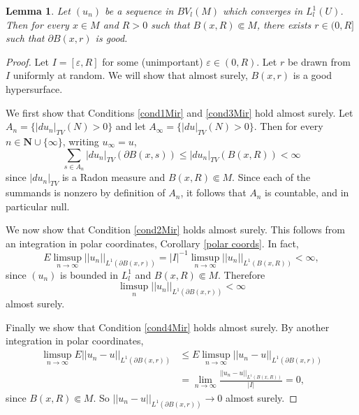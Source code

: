 \documentclass[reqno,12pt,letterpaper]{amsart}
\newcommand{\NN}{\mathbf{N}}
\newtheorem{lemma}[theorem]{Lemma}
\theoremstyle{definition}
\numberwithin{equation}{section}
\begin{document}
\begin{lemma}\label{probabilistic method}
Let $(u_n)$ be a sequence in $BV_l(M)$ which converges in $L^1_l(U)$. Then for every $x \in M$ and $R > 0$ such that $B(x, R) \Subset M$, there exists $r \in (0, R]$ such that $\partial B(x, r)$ is good.
\end{lemma}
\begin{proof}
Let $I = [\varepsilon, R]$ for some (unimportant) $\varepsilon \in (0, R)$.
Let $r$ be drawn from $I$ uniformly at random.
We will show that almost surely, $B(x, r)$ is a good hypersurface.

We first show that Conditions \ref{cond1Mir} and \ref{cond3Mir} hold almost surely.
Let $A_n = \{|du_n|_{TV}(N) > 0\}$ and let $A_\infty = \{|du|_{TV}(N) > 0\}$.
Then for every $n \in \NN \cup \{\infty\}$, writing $u_\infty = u$,
$$\sum_{s \in A_n} |du_n|_{TV}(\partial B(x, s)) \leq |du_n|_{TV}(B(x, R)) < \infty$$
since $|du_n|_{TV}$ is a Radon measure and $B(x, R) \Subset M$.
Since each of the summands is nonzero by definition of $A_n$, it follows that $A_n$ is countable, and in particular null.

We now show that Condition \ref{cond2Mir} holds almost surely.
This follows from an integration in polar coordinates, Corollary \ref{polar coords}. In fact,
$$E \limsup_{n \to \infty} ||u_n||_{L^1(\partial B(x, r))} = |I|^{-1} \limsup_{n \to \infty} ||u_n||_{L^1(B(x, R))} < \infty,$$
since $(u_n)$ is bounded in $L^1_l$ and $B(x, R) \Subset M$.
Therefore
$$\limsup_n ||u_n||_{L^1(\partial B(x, r))} < \infty$$
almost surely.

Finally we show that Condition \ref{cond4Mir} holds almost surely.
By another integration in polar coordinates,
\begin{align*}\limsup_{n \to \infty} E ||u_n - u||_{L^1(\partial B(x, r))} &\leq E \limsup_{n \to \infty} ||u_n - u||_{L^1(\partial B(x, r))}\\
&= \lim_{n \to \infty} \frac{||u_n - u||_{L^1(B(x, R))}}{|I|} = 0,
\end{align*}
since $B(x, R) \Subset M$.
So $||u_n - u||_{L^1(\partial B(x, r))} \to 0$ almost surely.
\end{proof}
\end{document}

